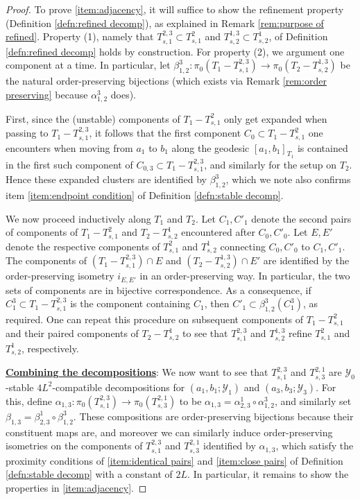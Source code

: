 \documentclass{amsart}
\theoremstyle{definition}
\theoremstyle{remark}
\theoremstyle{definition}
\newcommand{\calY}{\mathcal{Y}}
\begin{document}
\begin{proof}
To prove \eqref{item:adjacency}, it will suffice to show the refinement property (Definition \ref{defn:refined decomp}), as explained in Remark \ref{rem:purpose of refined}.  Property (1), namely that $T^{2,3}_{s,1} \subset T^2_{s,1}$ and $T^{1,3}_{s,2} \subset T^1_{s,2}$, of Definition \ref{defn:refined decomp} holds by construction.  For property (2), we argument one component at a time.  In particular, let $\beta^3_{1,2}:\pi_0(T_1 - T^{2,3}_{s,1}) \to \pi_0(T_2 - T^{1,3}_{s,2})$ be the natural order-preserving bijections (which exists via Remark \ref{rem:order preserving} because $\alpha^3_{1,2}$ does).

First, since the (unstable) components of $T_1 - T^2_{s,1}$ only get expanded when passing to $T_1 - T^{2,3}_{s,1}$, it follows that the first component $C_0 \subset T_1 - T^2_{s,1}$ one encounters when moving from $a_1$ to $b_1$ along the geodesic $[a_1,b_1]_{T_1}$ is contained in the first such component of $C_{0,3} \subset T_1 - T^{2,3}_{s,1}$, and similarly for the setup on $T_2$.  Hence these expanded clusters are identified by $\beta^3_{1,2}$, which we note also confirms item \eqref{item:endpoint condition} of Definition \ref{defn:stable decomp}.

We now proceed inductively along $T_1$ and $T_2$.  Let $C_1, C'_1$ denote the second pairs of components of $T_1 - T^2_{s,1}$ and $T_2 - T^1_{s,2}$ encountered after $C_0, C'_0$.  Let $E, E'$ denote the respective components of $T^2_{s,1}$ and $T^1_{s,2}$ connecting $C_0,C'_0$ to $C_1,C'_1$.  The components of $(T_1 - T^{2,3}_{s,1}) \cap E$ and $(T_2 - T^{1,3}_{s,2}) \cap E'$ are identified by the order-preserving isometry $i_{E,E'}$ in an order-preserving way.  In particular, the two sets of components are in bijective correspondence.  As a consequence, if $C^3_1 \subset T_1 - T^{2,3}_{s,1}$ is  the component containing $C_1$, then $C'_1 \subset \beta^{3}_{1,2}(C^3_1)$, as required.  One can repeat this procedure on subsequent components of $T_1 - T^2_{s,1}$ and their paired components of $T_2 - T^1_{s,2}$ to see that $T^{2,3}_{s,1}$ and $T^{1,3}_{s,2}$ refine $T^{2}_{s,1}$ and $T^1_{s,2}$, respectively.

\medskip

\textbf{\underline{Combining the decompositions}}: We now want to see that $T^{2,3}_{s,1}$ and $T^{2,1}_{s,3}$ are $\calY_0$-stable $4L^2$-compatible decompositions for $(a_1,b_1;\calY_1)$ and $(a_3,b_3;\calY_3)$.  For this, define $\alpha_{1,3}:\pi_0(T^{2,3}_{s,1}) \to \pi_0(T^{2,1}_{s,3})$ to be $\alpha_{1,3} = \alpha^{1}_{2,3} \circ \alpha^3_{1,2}$, and similarly set $\beta_{1,3} = \beta^1_{2,3} \circ \beta^3_{1,2}$.  These compositions are order-preserving bijections because their constituent maps are, and moreover we can similarly induce order-preserving isometries on the components of $T^{2,3}_{s,1}$ and $T^{2,1}_{s,3}$ identified by $\alpha_{1,3}$, which satisfy the proximity conditions of \eqref{item:identical pairs} and \eqref{item:close pairs} of Definition \ref{defn:stable decomp} with a constant of $2L$.  In particular, it remains to show the properties in \eqref{item:adjacency}.


\end{proof}
\end{document}
